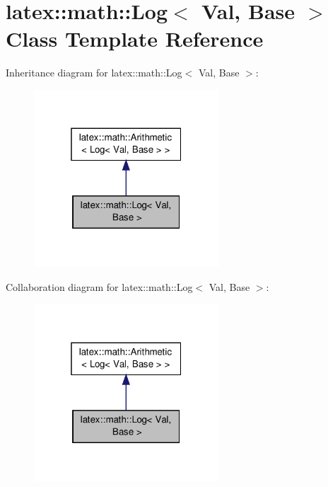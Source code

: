 \hypertarget{classlatex_1_1math_1_1Log}{\section{latex\-:\-:math\-:\-:Log$<$ Val, Base $>$ Class Template Reference}
\label{classlatex_1_1math_1_1Log}
}


Inheritance diagram for latex\-:\-:math\-:\-:Log$<$ Val, Base $>$\-:
\nopagebreak
\begin{figure}[H]
\begin{center}
\leavevmode
\includegraphics[width=196pt]{classlatex_1_1math_1_1Log__inherit__graph}
\end{center}
\end{figure}


Collaboration diagram for latex\-:\-:math\-:\-:Log$<$ Val, Base $>$\-:
\nopagebreak
\begin{figure}[H]
\begin{center}
\leavevmode
\includegraphics[width=196pt]{classlatex_1_1math_1_1Log__coll__graph}
\end{center}
\end{figure}
